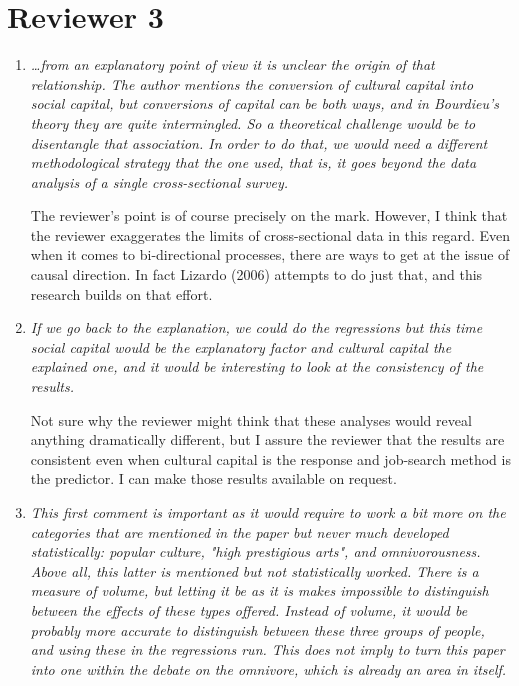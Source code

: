 \documentclass[11pt]{article}
\begin{document}
\section{Reviewer 3}
\begin{enumerate}
	\item \emph{{\ldots}from an explanatory point of view it is unclear the origin of that relationship. The author mentions the conversion of cultural capital into social capital, but conversions of capital can be both ways, and in Bourdieu's theory they are quite intermingled. So a theoretical challenge would be to disentangle that association. In order to do that, we would need a different methodological strategy that the one used, that is, it goes beyond the data analysis of a single cross-sectional survey. }
	
	The reviewer's point is of course precisely on the mark.  However, I think that the reviewer exaggerates the limits of cross-sectional data in this regard. Even when it comes to bi-directional processes, there are ways to get at the issue of causal direction.  In fact Lizardo (2006) attempts to do just that, and this research builds on that effort. 
	
	\item \emph{If we go back to the explanation, we could do the regressions but this time social capital would be the explanatory factor and cultural capital the explained one, and it would be interesting to look at the consistency of the results. }
	
	Not sure why the reviewer might think that these analyses would reveal anything dramatically different, but I assure the reviewer that the results are consistent even when cultural capital is the response and job-search method is the predictor.  I can make those results available on request.
	
	\item \emph{This first comment is important as it would require to work a bit more on the categories that are mentioned in the paper but never much developed statistically: popular culture, "high prestigious arts", and omnivorousness. Above all, this latter is mentioned but not statistically worked. There is a measure of volume, but letting it be as it is makes impossible to distinguish between the effects of these types offered. Instead of volume, it would be probably more accurate to distinguish between these three groups of people, and using these in the regressions run. This does not imply to turn this paper into one within the debate on the omnivore, which is already an area in itself. }
	

\end{enumerate}
\end{document}
